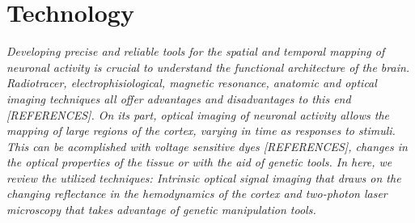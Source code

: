 \chapter{Technology}
\label{cap:Technology}

\textit{Developing precise and reliable tools for the spatial and temporal mapping of neuronal activity is crucial to understand the functional architecture of the brain. Radiotracer, electrophisiological, magnetic resonance, anatomic and optical imaging techniques all offer advantages and disadvantages to this end [REFERENCES]. On its part, optical imaging of neuronal activity allows the mapping of large regions of the cortex, varying in time as responses to stimuli. This can be acomplished with voltage sensitive dyes [REFERENCES], changes in the optical properties of the tissue or with the aid of genetic tools. In here, we review the utilized techniques: Intrinsic optical signal imaging that draws on the changing reflectance in the hemodynamics of the cortex and two-photon laser microscopy that takes advantage of genetic manipulation tools.}





